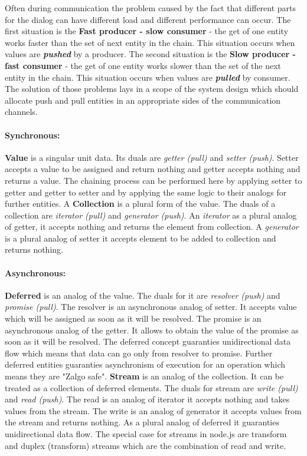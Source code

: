 Often during communication the problem caused by the fact that different parts for the dialog can have different load and different performance can occur. The first situation is the \textbf{Fast producer - slow consumer} - the get of one entity works faster than the set of next entity in the chain. This situation occurs when values are \textbf{\textit{pushed}} by a producer. The second situation is the  \textbf{Slow producer - fast consumer} - the get of one entity works slower than the  set of the next entity in the chain. This situation occurs when values are \textbf{\textit{pulled}} by consumer. The solution of  those problems lays in a scope of the system design which should allocate push and pull entities in an appropriate sides of the communication channels.

\paragraph{Synchronous:} \textbf{Value} is a singular unit data. Its duals are \textit{getter (pull)} and \textit{setter (push)}. Setter accepts a value to be assigned and return nothing and getter accepts nothing and returns a value. The chaining process  can be performed here by applying setter to getter and getter to setter and by applying the same logic to their analogs for further  entities. A \textbf{Collection} is a plural form of the value. The duals of a collection are \textit{iterator (pull)} and \textit{generator (push)}. An \textit{iterator }as a plural analog of getter, it accepts nothing and returns the element from collection. A \textit{generator} is a plural analog of setter it accepts element to be added to collection and returns nothing.

\paragraph{Asynchronous:} \textbf{Deferred} is an analog of the value. The duals for it are \textit{resolver (push)} and \textit{promise (pull)}. The resolver is an asynchronous analog of setter. It  accepts value which will be assigned as soon as it will be resolved. The promise is an asynchronous analog of the getter. It allows to obtain the value of the promise as soon as it will be resolved. The deferred concept guaranties unidirectional data flow which means that data can go only from resolver to promise. Further deferred entities guaranties asynchronism of execution for an operation which means they are "Zalgo safe"\cite{asyncPerformance}. \textbf{Stream} is an analog of the collection. It can be treated as a collection of deferred elements. The duals for stream are \textit{write (pull)} and \textit{read (push)}. The read is an analog of iterator it accepts nothing and takes values from the stream. The write is an analog of generator it accepts values from the stream and returns nothing. As a plural analog of deferred it guaranties unidirectional data flow.  The special case for streams in node.js are transform and duplex (transform) streams which are the combination of read and write.


